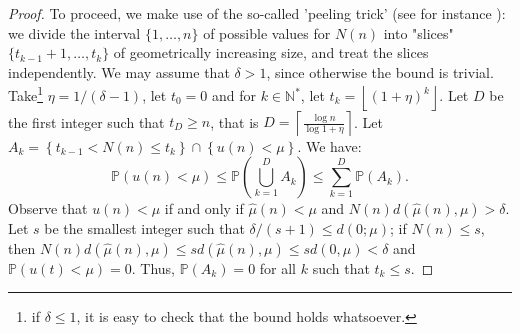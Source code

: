 \documentclass[wcp]{jmlr}
\newcommand{\N}{\mathbb{N}}
\renewcommand{\P}{\mathbb{P}}
\newcommand{\1}{\mathbbm{1}}
\begin{document}
{\begin{proof}
  To proceed, we make use of the so-called 'peeling trick' (see for instance
  \cite{massart2007}): we divide the interval $\{1,\dots, n\}$ of possible
  values for $N(n)$ into "slices" $\{t_{k-1}+1,\dots,t_k\}$ of geometrically
  increasing size, and treat the slices independently.  We may assume that
  $\delta>1$, since otherwise the bound is trivial. Take\footnote{if
    $\delta\leq 1$, it is easy to check that the bound holds whatsoever.} $\eta
  = 1/(\delta-1)$, let $t_0=0$ and for $k\in\N^{*}$, let $t_k = \left\lfloor
    (1+\eta)^k \right\rfloor$.  Let $D$ be the first integer such that $t_D\geq
  n$, that is $D=\left\lceil\frac{\log n}{\log 1+\eta}\right\rceil$.  Let $A_k
  = \left\{t_{k-1} < N(n)\leq t_k\right\}\cap \left\{ u(n)<\mu\right\}$. We
  have:
  \begin{equation}
    \label{eq:peeling:basic}
    \P\left( u(n)<\mu\right)  \leq \P\left( \bigcup_{k=1}^D A_k\right) \leq \sum_{k=1}^D \P\left(A_k\right).
  \end{equation}
  Observe that $u(n)<\mu $ if and only if $\hat{\mu}(n)<\mu$ and
  $N(n)d(\hat{\mu}(n), \mu)>\delta$.  Let $s$ be the smallest integer such that
  $\delta/(s+1)\leq d(0;\mu)$; if $N(n)\leq s$, then $N(n)d(\hat{\mu}(n),
  \mu)\leq s d(\hat{\mu}(n), \mu)\leq sd(0,\mu)< \delta$ and $\P( u(t)< \mu
  )=0$.  Thus, $\P\left(A_k\right)=0$ for all $k$ such that $t_k\leq s$.


\end{proof}}
\end{document}

